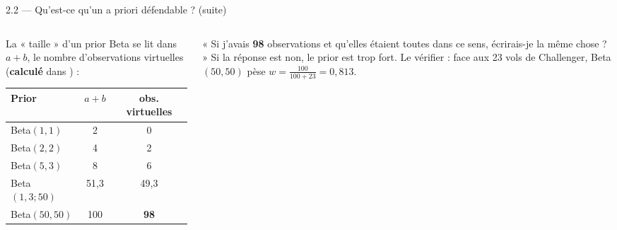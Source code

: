 \begin{frame}{2.2 — Qu'est-ce qu'un a priori défendable ? (suite)}
\begin{columns}[t]
\begin{column}{0.55\textwidth}
\begin{ebox}
La « taille » d'un prior Beta se lit dans $a+b$, le nombre d'observations virtuelles
(\textbf{calculé} dans ) :
\begin{center}
\begin{tabular}{@{}lcc@{}}
\toprule
\textbf{Prior} & $a+b$ & \textbf{obs. virtuelles} \\
\midrule
Beta$(1,1)$ & 2 & 0 \\
Beta$(2,2)$ & 4 & 2 \\
Beta$(5,3)$ & 8 & 6 \\
Beta$(1{,}3;50)$ & 51,3 & 49,3 \\
Beta$(50,50)$ & 100 & \textbf{98} \\
\bottomrule
\end{tabular}
\end{center}
\end{ebox}
\end{column}
\begin{column}{0.42\textwidth}
\begin{wbox}
« Si j'avais \textbf{98} observations et qu'elles étaient toutes dans ce sens,
écrirais-je la même chose ? » Si la réponse est non, le prior est trop fort.
Le vérifier : face aux 23 vols de Challenger, Beta$(50,50)$ pèse
$w = \frac{100}{100+23} = 0{,}813$.
\end{wbox}
\end{column}
\end{columns}
\end{frame}

